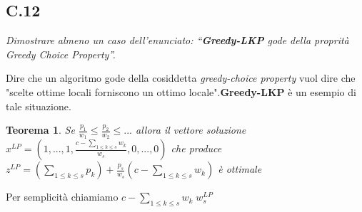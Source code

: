 \documentclass[a4paper]{article}
\newtheorem*{theorem}{Teorema}
\begin{document}
\subsection{C.12}
\emph{Dimostrare almeno un caso dell’enunciato: “\textbf{Greedy-LKP} gode della proprità Greedy Choice Property”.}


Dire che un algoritmo gode della cosiddetta \textit{greedy-choice property} vuol dire che "scelte ottime locali forniscono un ottimo locale".\textbf{Greedy-LKP} è un esempio di tale situazione.
\begin{theorem}
	Se $\frac{p_1}{w_1} \leq \frac{p_2}{w_2} \leq ...$ allora il vettore soluzione 
	$x^{LP}= (1, ... ,1,\frac{c- \sum_{1 \leq k \leq s}w_k}{w_s} ,0, ... ,0)$ che produce
	$z^{LP} = (\sum_{1 \leq k \leq s} p_k)+\frac{p_s}{w_s}(c- \sum_{1 \leq k \leq s}w_k)$ è ottimale 
\end{theorem}
Per semplicità chiamiamo $c- \sum_{1 \leq k \leq s}w_k \; w_s^{LP}$
\end{document}
